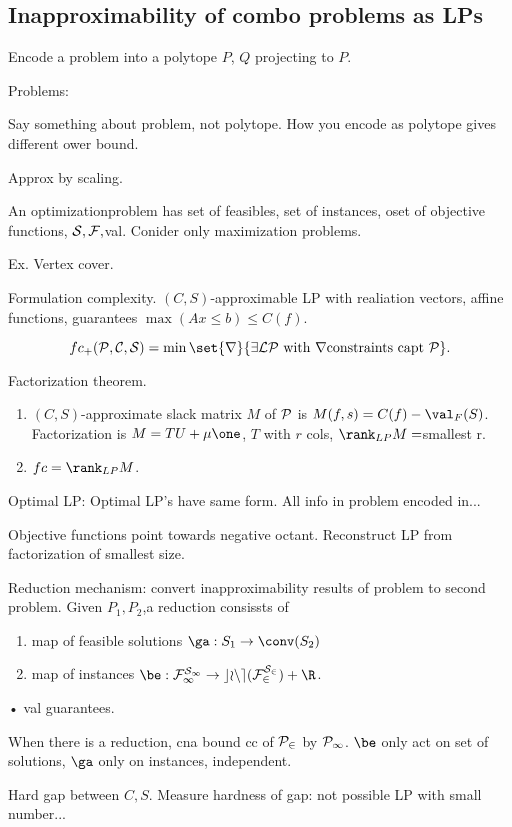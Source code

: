 
\subsection{Inapproximability of combo problems as LPs}

Encode a problem into a polytope $P$, $Q$ projecting to $P$. 


Problems: 

Say something about problem, not polytope. How you encode as polytope gives different ower bound.

Approx by scaling.


An optimizationproblem has set of feasibles, set of instances, oset of objective functions, $\cal S,\cal F, $val. Conider only maximization problems. 

Ex. Vertex cover.

Formulation complexity. $(C,S)$-approximable LP with realiation vectors, affine functions, guarantees $\max(Ax\le b)\le C(f)$.

\[
fc_+(\cal P, \cal C, \cal S)=\min\set{r}{\exists LP\text{ with }r\text{constraints capt }\cal P}.
\]

Factorization theorem. 
\begin{enumerate}
\item
$(C,S)$-approximate slack matrix $M$ of $\cal P$ is $M(f,s)=C(f)-\val_F(S)$. Factorization is $M=TU+\mu \one$, $T$ with $r$ cols, $\rank_{LP}M= $smallest r.
\item
$fc=\rank_{LP}M$.
\end{enumerate}

Optimal LP: Optimal LP's have same form. All info in problem encoded in... %

Objective functions point towards negative octant. Reconstruct LP from factorization of smallest size. 

Reduction mechanism: convert inapproximability results of problem to second problem. Given $P_1,P_2$,a reduction consissts of 
\begin{enumerate}
\item
map of feasible solutions $\ga :S_1\to \conv(S_2)$
\item
map of instances $\be:\cal F_1^{S_1}\to cone(\cal F_2^{S_2})+\R$.
\end{enumerate}•
val guarantees.

When there is a reduction, cna bound cc of $\cal P_2$ by $\cal P_1$. $\be$ only act on set of solutions, $\ga $ only on instances, independent. 

Hard gap between $C,S$. Measure hardness of gap: not possible LP with small number...

